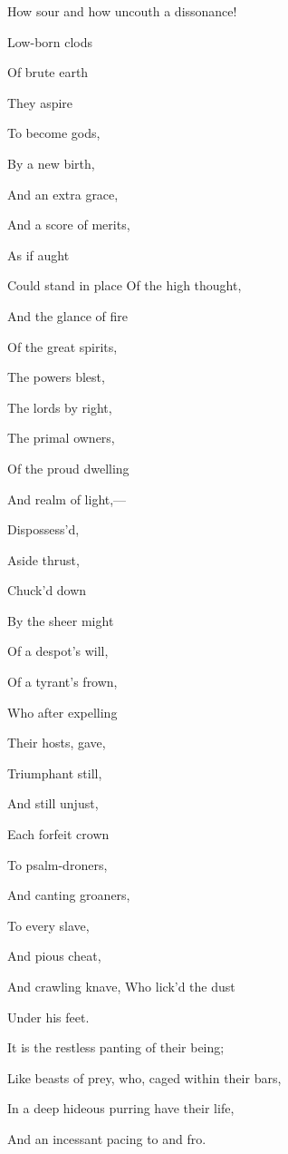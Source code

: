 
How sour and how uncouth a dissonance!


Low-born clods

Of brute earth

They aspire

To become gods,

By a new birth,

And an extra grace,

And a score of merits,

As if aught

Could stand in place Of the high thought,

And the glance of fire

Of the great spirits,

The powers blest,

The lords by right,

The primal owners,

Of the proud dwelling

And realm of light,—

Dispossess'd,

Aside thrust,

Chuck'd down

By the sheer might

Of a despot's will,

Of a tyrant's frown,

Who after expelling

Their hosts, gave,

Triumphant still,

And still unjust,

Each forfeit crown

To psalm-droners,

And canting groaners,

To every slave,

And pious cheat,

And crawling knave, Who lick'd the dust

Under his feet.


It is the restless panting of their being;

Like beasts of prey, who, caged within their bars,

In a deep hideous purring have their life,

And an incessant pacing to and fro.


